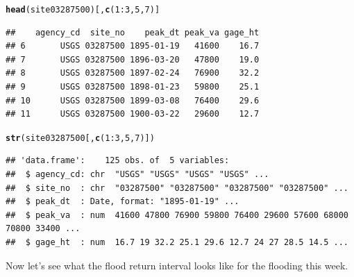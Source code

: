 \documentclass{tufte-handout}\usepackage[]{graphicx}\usepackage[]{xcolor}
\makeatletter
\newcommand{\hlnum}[1]{\textcolor[rgb]{0.686,0.059,0.569}{#1}}%
\newcommand{\hlopt}[1]{\textcolor[rgb]{0,0,0}{#1}}%
\newcommand{\hlstd}[1]{\textcolor[rgb]{0.345,0.345,0.345}{#1}}%
\newcommand{\hlkwd}[1]{\textcolor[rgb]{0.737,0.353,0.396}{\textbf{#1}}}%
\newenvironment{kframe}{%
 \def\at@end@of@kframe{}%
 \ifinner\ifhmode%
  \def\at@end@of@kframe{\end{minipage}}%
  \begin{minipage}{\columnwidth}%
 \fi\fi%
 \def\FrameCommand##1{\hskip\@totalleftmargin \hskip-\fboxsep
 \colorbox{shadecolor}{##1}\hskip-\fboxsep
     \hskip-\linewidth \hskip-\@totalleftmargin \hskip\columnwidth}%
 \MakeFramed {\advance\hsize-\width
   \@totalleftmargin\z@ \linewidth\hsize
   \@setminipage}}%
 {\par\unskip\endMakeFramed%
 \at@end@of@kframe}
\newenvironment{knitrout}{}{} %
\makeatother
\begin{document}
\begin{knitrout}
\color{fgcolor}\begin{kframe}
\begin{alltt}
\hlkwd{head}\hlstd{(site03287500)[,}\hlkwd{c}\hlstd{(}\hlnum{1}\hlopt{:}\hlnum{3}\hlstd{,}\hlnum{5}\hlstd{,}\hlnum{7}\hlstd{)]}
\end{alltt}
\begin{verbatim}
##    agency_cd  site_no    peak_dt peak_va gage_ht
## 6       USGS 03287500 1895-01-19   41600    16.7
## 7       USGS 03287500 1896-03-20   47800    19.0
## 8       USGS 03287500 1897-02-24   76900    32.2
## 9       USGS 03287500 1898-01-23   59800    25.1
## 10      USGS 03287500 1899-03-08   76400    29.6
## 11      USGS 03287500 1900-03-22   29600    12.7
\end{verbatim}
\begin{alltt}
\hlkwd{str}\hlstd{(site03287500[,}\hlkwd{c}\hlstd{(}\hlnum{1}\hlopt{:}\hlnum{3}\hlstd{,}\hlnum{5}\hlstd{,}\hlnum{7}\hlstd{)])}
\end{alltt}
\begin{verbatim}
## 'data.frame':	125 obs. of  5 variables:
##  $ agency_cd: chr  "USGS" "USGS" "USGS" "USGS" ...
##  $ site_no  : chr  "03287500" "03287500" "03287500" "03287500" ...
##  $ peak_dt  : Date, format: "1895-01-19" ...
##  $ peak_va  : num  41600 47800 76900 59800 76400 29600 57600 68000 70800 33400 ...
##  $ gage_ht  : num  16.7 19 32.2 25.1 29.6 12.7 24 27 28.5 14.5 ...
\end{verbatim}
\end{kframe}
\end{knitrout}

Now let's see what the flood return interval looks like for the flooding this week. 
\end{document}
